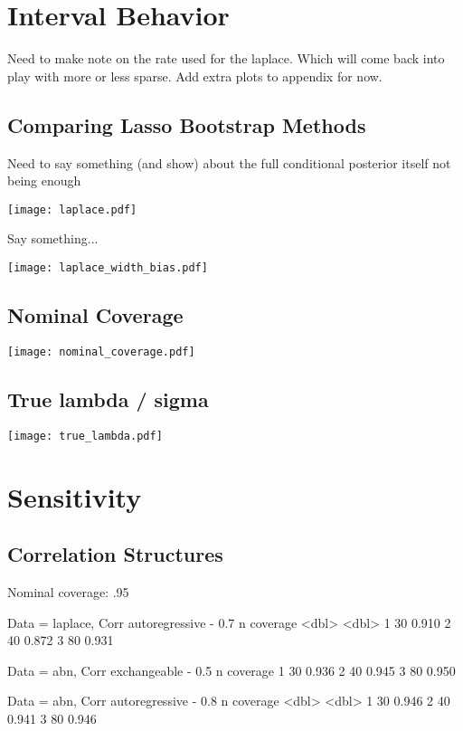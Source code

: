 \section{Interval Behavior}

Need to make note on the rate used for the laplace. Which will come back into play with more or less sparse. Add extra plots to appendix for now.

\subsection{Comparing Lasso Bootstrap Methods}

Need to say something (and show) about the full conditional posterior itself not being enough

\texttt{[image: laplace.pdf]}

Say something...

\texttt{[image: laplace\_width\_bias.pdf]}

\subsection{Nominal Coverage}

\texttt{[image: nominal\_coverage.pdf]}

\subsection{True lambda / sigma}

\texttt{[image: true\_lambda.pdf]}

\section{Sensitivity}

\subsection{Correlation Structures}

Nominal coverage: .95

Data = laplace, Corr autoregressive - 0.7
      n coverage
  <dbl>    <dbl>
1    30    0.910
2    40    0.872
3    80    0.931

Data = abn, Corr exchangeable - 0.5
      n coverage
1    30    0.936
2    40    0.945
3    80    0.950

Data = abn, Corr autoregressive - 0.8
      n coverage
  <dbl>    <dbl>
1    30    0.946
2    40    0.941
3    80    0.946

